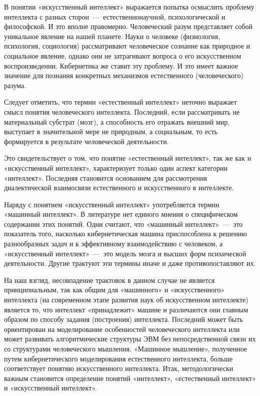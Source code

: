 \documentclass[14pt]{extarticle}
\begin{document}
\title{}
\maketitle

В понятии «искусственный интеллект» выражается попытка осмыслить проблему интеллекта с разных сторон~---~естественнонаучной, психологической и философской. И это вполне правомерно. Человеческий разум представляет собой уникальное явление на нашей планете. Науки о человеке (физиология, психология, социология) рассматривают человеческое сознание как природное и социальное явление, однако они не затрагивают вопроса о его искусственном воспроизведении. Кибернетика же ставит эту проблему. И это имеет важное значение для познания конкретных механизмов естественного (человеческого) разума.

Следует отметить, что термин «естественный интеллект» неточно выражает смысл понятия человеческого интеллекта. Последний, если рассматривать не материальный субстрат (мозг), а способность его отражать внешний мир, выступает в значительной мере не природным, а социальным, то есть формируется в результате человеческой деятельности.

Это свидетельствует о том, что понятие «естественный интеллект», так же как и «искусственный интеллект», характеризует только один аспект категории «интеллект». Последняя становится основанием для рассмотрения диалектической взаимосвязи естественного и искусственного в интеллекте.

Наряду с понятием «искусственный интеллект» употребляется термин «машинный интеллект». В литературе нет единого мнения о специфическом содержании этих понятий. Одни считают, что «машинный интеллект»~---~это показатель того, насколько кибернетическая машина приспособлена к решению разнообразных задач и к эффективному взаимодействию с человеком, а «искусственный интеллект»~---~это модель мозга и высших форм психической деятельности. Другие трактуют эти термины иначе и даже противопоставляют их.

На наш взгляд, несовпадение трактовок в данном случае не является принципиальным, так как общим для «машинного» и «искусственного» интеллекта (на современном этапе развития наук об искусственном интеллекте) является то, что интеллект «принадлежит» машине и различаются они главным образом по способу задания (построения) интеллекта. Последний может быть ориентирован на моделирование особенностей человеческого интеллекта или может развивать алгоритмические структуры ЭВМ без непосредственной связи их со структурами человеческого мышления. «Машинное мышление», полученное путем кибернетического моделирования естественного интеллекта, больше соответствует понятию искусственного интеллекта. Итак, методологически важным становится определение понятий «интеллект», «естественный интеллект» и «искусственный интеллект».
\end{document}

